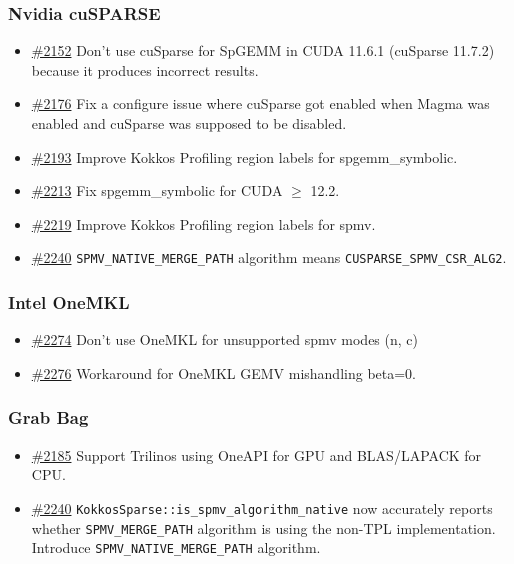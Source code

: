 \begin{frame}
\frametitle{Nvidia cuSPARSE}

\begin{itemize}
\item \href{https://github.com/kokkos/kokkos-kernels/pull/2152}{\#2152}
Don't use cuSparse for SpGEMM in CUDA 11.6.1 (cuSparse 11.7.2) because it produces incorrect results.
\item \href{https://github.com/kokkos/kokkos-kernels/pull/2176}{\#2176}
Fix a configure issue where cuSparse got enabled when Magma was enabled and cuSparse was supposed to be disabled.
\item \href{https://github.com/kokkos/kokkos-kernels/pull/2193}{\#2193}
Improve Kokkos Profiling region labels for spgemm\_symbolic.
\item \href{https://github.com/kokkos/kokkos-kernels/pull/2213}{\#2213}
Fix spgemm\_symbolic for CUDA $\geq$ 12.2.
\item \href{https://github.com/kokkos/kokkos-kernels/pull/2219}{\#2219}
Improve Kokkos Profiling region labels for spmv.
\item \href{https://github.com/kokkos/kokkos-kernels/pull/2240}{\#2240}
\texttt{SPMV\_NATIVE\_MERGE\_PATH} algorithm means \texttt{CUSPARSE\_SPMV\_CSR\_ALG2}.
\end{itemize}
\end{frame}

\begin{frame}
\frametitle{Intel OneMKL}

\begin{itemize}
\item \href{https://github.com/kokkos/kokkos-kernels/pull/2274}{\#2274}
Don't use OneMKL for unsupported spmv modes (n, c)
\item \href{https://github.com/kokkos/kokkos-kernels/pull/2276}{\#2276}
Workaround for OneMKL GEMV mishandling beta=0.
\end{itemize}
\end{frame}

\begin{frame}
\frametitle{Grab Bag}
\begin{itemize}
\item \href{https://github.com/kokkos/kokkos-kernels/pull/2185}{\#2185}
Support Trilinos using OneAPI for GPU and BLAS/LAPACK for CPU.
\item \href{https://github.com/kokkos/kokkos-kernels/pull/2240}{\#2240}
\texttt{KokkosSparse::is\_spmv\_algorithm\_native} now accurately reports whether \texttt{SPMV\_MERGE\_PATH} algorithm is using the non-TPL implementation.
Introduce \texttt{SPMV\_NATIVE\_MERGE\_PATH} algorithm.
\end{itemize}
\end{frame}

